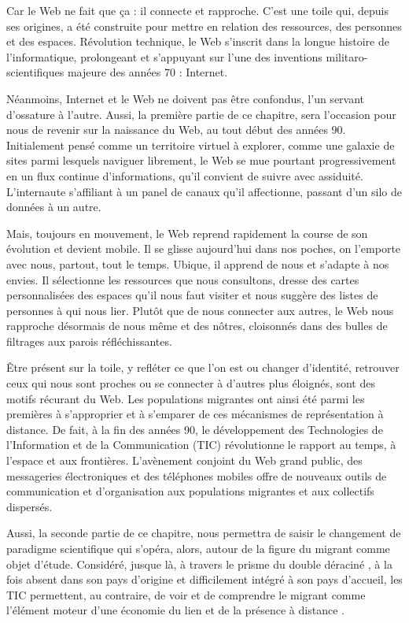 \documentclass[symmetric,justified,marginals=raggedouter]{tufte-book}
\begin{document}
Car le Web ne fait que ça : il connecte et rapproche. C'est une toile qui, depuis ses origines, a été construite pour mettre en relation des ressources, des personnes et des espaces. Révolution technique, le Web s'inscrit dans la longue histoire de l'informatique, prolongeant et s'appuyant sur l'une des inventions militaro-scientifiques majeure des années 70 \citep{hafner_where_1998} : Internet. 

Néanmoins, Internet et le Web ne doivent pas être confondus, l'un servant d'ossature à l'autre. Aussi, la première partie de ce chapitre, sera l'occasion pour nous de revenir sur la naissance du Web, au tout début des années 90. Initialement pensé comme un territoire virtuel à explorer, comme une galaxie de sites parmi lesquels naviguer librement, le Web se mue pourtant progressivement en un flux continue d'informations, qu'il convient de suivre avec assiduité. L'internaute s'affiliant à un panel de canaux qu'il affectionne, passant d'un silo de données à un autre. 

Mais, toujours en mouvement, le Web reprend rapidement la course de son évolution et devient mobile. Il se glisse aujourd'hui dans nos poches, on l'emporte avec nous, partout, tout le temps. Ubique, il apprend de nous et s'adapte à nos envies. Il sélectionne les ressources que nous consultons, dresse des cartes personnalisées des espaces qu'il nous faut visiter et nous suggère des listes de personnes à qui nous lier. Plutôt que de nous connecter aux autres, le Web nous rapproche désormais de nous même et des nôtres, cloisonnés dans des bulles de filtrages aux parois réfléchissantes.

Être présent sur la toile, y refléter ce que l'on est ou changer d'iden\-tité, retrouver ceux qui nous sont proches ou se connecter à d'autres plus éloignés, sont des motifs récurant du Web. Les populations migrantes ont ainsi été parmi les premières à s'approprier et à s'emparer de ces mécanismes de représentation à distance. De fait, à la fin des années 90, le développement des Technologies de l'Information et de la Communication (TIC) révolutionne le rapport au temps, à l'espace et aux frontières. L'avènement conjoint du Web grand public, des messageries électroniques et des téléphones mobiles offre de nouveaux outils de communication et d'organisation aux populations migrantes et aux collectifs dispersés. 

Aussi, la seconde partie de ce chapitre, nous permettra de saisir le changement de paradigme scientifique qui s'opéra, alors, autour de la figure du migrant comme objet d'étude. Considéré, jusque là, à travers le prisme du double déraciné \citep{sayad_double_1999}, à la fois absent dans son pays d'origine et difficilement intégré à son pays d'accueil, les TIC permettent, au contraire, de voir et de comprendre le migrant comme l'élément moteur d'une économie du lien et de la présence à distance \citep{diminescu_connected_2008}. 
\end{document}
